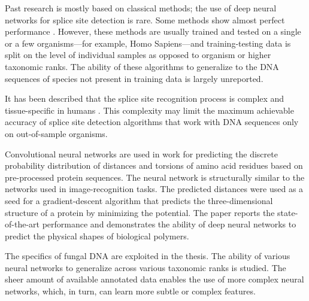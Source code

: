 Past research is mostly based on classical methods; the use of deep neural
networks for splice site detection is rare. Some methods show almost perfect
performance \cite{sarkar2019splice}. However, these methods are usually trained
and tested on a single or a few organisms---for example, Homo Sapiens---and
training-testing data is split on the level of individual samples as opposed to
organism or higher taxonomic ranks. The ability of these algorithms to
generalize to the DNA sequences of species not present in training data is
largely unreported.

It has been described that the splice site recognition process is complex and
tissue-specific in humans \cite{pineda2018most}. This complexity may limit the
maximum achievable accuracy of splice site detection algorithms that work with
DNA sequences only on out-of-sample organisms.

Convolutional neural networks are used in work \cite{senior2020improved} for
predicting the discrete probability distribution of distances and torsions of
amino acid residues based on pre-processed protein sequences. The neural
network is structurally similar to the networks used in image-recognition
tasks. The predicted distances were used as a seed for a gradient-descent
algorithm that predicts the three-dimensional structure of a protein by
minimizing the potential. The paper reports the state-of-the-art performance
and demonstrates the ability of deep neural networks to predict the physical
shapes of biological polymers.

The specifics of fungal DNA are exploited in the thesis. The ability of various
neural networks to generalize across various taxonomic ranks is studied. The
sheer amount of available annotated data enables the use of more complex neural
networks, which, in turn, can learn more subtle or complex features.
